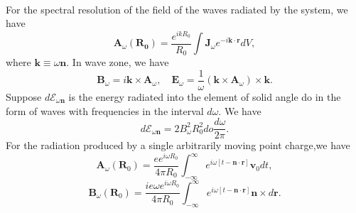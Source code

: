 \\
For the spectral resolution of the field of the waves radiated by the system, we have
\[\bm{A}_{\omega}(\bm{R_0}) =  \frac{e^{ikR_0}}{R_0} \int \bm{J}_{\omega} e^{-i\bm{k}\cdot\bm{r}} dV,\]
where $\bm{k} \equiv \omega\bm{n}$.
In wave zone, we have
\[\bm{B}_{\omega} = i\bm{k} \times \bm{A}_{\omega} , \quad \bm{E}_{\omega} = \frac{1}{\omega} \left( \bm{k} \times \bm{A}_{\omega}\right) \times \bm{k}.\]
Suppose $d\mathcal{E}_{\omega\bm{n}}$ is the energy radiated into the element of solid angle do in the form of waves with frequencies in the interval $d\omega$. We have
\[d\mathcal{E}_{\omega\bm{n}} = 2B_{\omega}^2 R_0^2 do \frac{d\omega}{2\pi}.\]
For the radiation produced by a single arbitrarily moving point charge,we have
\[\bm{A}_{\omega}(\bm{R}_0) = \frac{e e^{i\omega
R_0}}{4\pi R_0}  \int_{-\infty}^{\infty} e^{i\omega[
t-\bm{n}\cdot\bm{r}]} \bm{v}_0 dt,\]
\[\bm{B}_{\omega}(\bm{R}_0) = \frac{ie\omega e^{i\omega
R_0}}{4\pi R_0}  \int_{-\infty}^{\infty} e^{i\omega[
t-\bm{n}\cdot\bm{r}]}  \bm{n} \times d\bm{r}.\]

